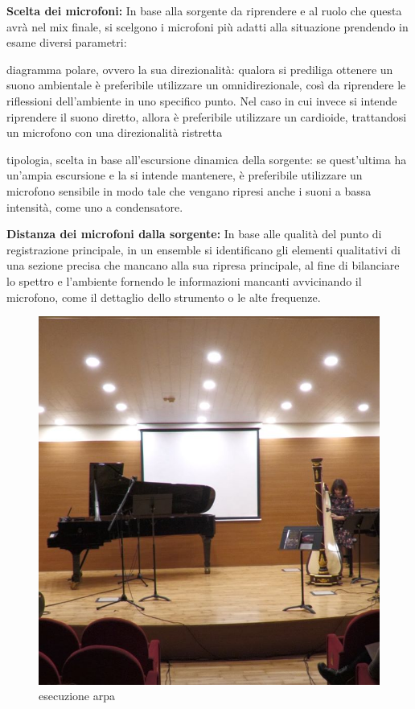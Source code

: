 	\begin{compactitem}
		\item \textbf{Scelta dei microfoni:} In base alla sorgente da riprendere e al ruolo che questa avrà nel mix finale, si scelgono i microfoni più adatti alla situazione prendendo in esame diversi parametri:
			\begin{compactitem}
				\item diagramma polare, ovvero la sua direzionalità: qualora si prediliga ottenere un suono ambientale è preferibile utilizzare un omnidirezionale, così da riprendere le riflessioni dell'ambiente in uno specifico punto. Nel caso in cui invece si intende riprendere il suono diretto, allora è preferibile utilizzare un cardioide, trattandosi un microfono con una direzionalità ristretta
				\item tipologia, scelta in base all'escursione dinamica della sorgente: se quest'ultima ha un'ampia escursione e la si intende mantenere, è preferibile utilizzare un microfono sensibile in modo tale che vengano ripresi anche i suoni a bassa intensità, come uno a condensatore.
			\end{compactitem}
		\item \textbf{Distanza dei microfoni dalla sorgente:} In base alle qualità del punto di registrazione principale, in un ensemble si identificano gli elementi qualitativi di una sezione precisa che mancano alla sua ripresa principale, al fine di bilanciare lo spettro e l'ambiente fornendo le informazioni mancanti avvicinando il microfono, come il dettaglio dello strumento o le alte frequenze.
	\end{compactitem}

	\begin{figure}[h]
		\begin{center}
			\includegraphics[width= .50\textwidth]{img/image3.jpg}
			\caption{esecuzione arpa}
		\end{center}
	\end{figure}
	

